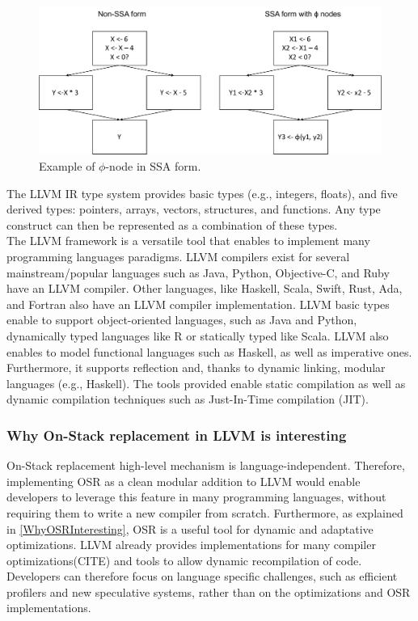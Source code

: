 \begin{figure}[h]
\centering
\includegraphics[scale=0.5]{Figures/SSAForm}
\decoRule
\caption[SSA example]{Example of $\phi$-node in SSA form.}
\label{SSA example}
\end{figure}

The LLVM IR type system provides basic types (e.g., integers, floats), and five derived types: pointers, arrays, vectors, structures, and functions.
Any type construct can then be represented as a combination of these types.\\

The LLVM framework is a versatile tool that enables to implement many programming languages paradigms.
LLVM compilers exist for several mainstream/popular languages such as Java, Python, Objective-C, and Ruby have an LLVM compiler.
Other languages, like Haskell, Scala, Swift, Rust, Ada, and Fortran also have an LLVM compiler implementation.
LLVM basic types enable to support object-oriented languages, such as Java and Python, dynamically typed languages like R or statically typed like Scala.
LLVM also enables to model functional languages such as Haskell, as well as imperative ones. 
Furthermore, it supports reflection and, thanks to dynamic linking, modular languages (e.g., Haskell).
The tools provided enable static compilation as well as dynamic compilation techniques such as Just-In-Time compilation (JIT).\\

\subsubsection{Why On-Stack replacement in LLVM is interesting}
On-Stack replacement high-level mechanism is language-independent.
Therefore, implementing OSR as a clean modular addition to LLVM would enable developers to leverage this feature in many programming languages, without requiring them to write a new compiler from scratch.
Furthermore, as explained in \ref{WhyOSRInteresting}, OSR is a useful tool for dynamic and adaptative optimizations.
LLVM already provides implementations for many compiler optimizations(CITE) and tools to allow dynamic recompilation of code.
Developers can therefore focus on language specific challenges, such as efficient profilers and new speculative systems, rather than on the optimizations and OSR implementations.

